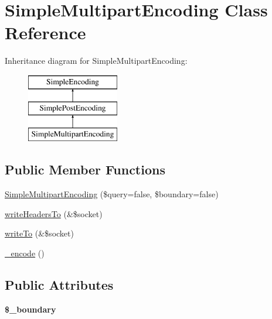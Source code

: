 \hypertarget{class_simple_multipart_encoding}{
\section{SimpleMultipartEncoding Class Reference}
\label{class_simple_multipart_encoding}
}
Inheritance diagram for SimpleMultipartEncoding:\begin{figure}[H]
\begin{center}
\leavevmode
\includegraphics[height=3.000000cm]{class_simple_multipart_encoding}
\end{center}
\end{figure}
\subsection*{Public Member Functions}
\begin{DoxyCompactItemize}
\item 
\hyperlink{class_simple_multipart_encoding_ad7311975ea717cd2ce3eb44db7a2ec90}{SimpleMultipartEncoding} (\$query=false, \$boundary=false)
\item 
\hyperlink{class_simple_multipart_encoding_a6b5cef09d6de499b8eec15bf81ac70fc}{writeHeadersTo} (\&\$socket)
\item 
\hyperlink{class_simple_multipart_encoding_acaedbfc33a85c6db3ea616491b00442b}{writeTo} (\&\$socket)
\item 
\hyperlink{class_simple_multipart_encoding_abaf98447496b4c38e470684da14e9ef5}{\_\-encode} ()
\end{DoxyCompactItemize}
\subsection*{Public Attributes}
\begin{DoxyCompactItemize}
\item 
\hypertarget{class_simple_multipart_encoding_a51bda7622c19093db4c52d87e428eb18}{
{\bfseries \$\_\-boundary}}
\label{class_simple_multipart_encoding_a51bda7622c19093db4c52d87e428eb18}

\end{DoxyCompactItemize}


